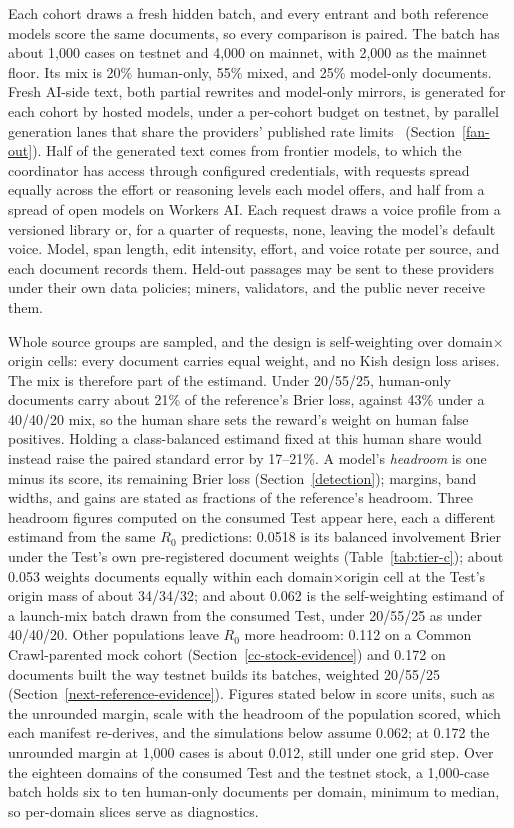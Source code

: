 Each cohort draws a fresh hidden batch, and every entrant and both reference
models score the same documents, so every comparison is paired. The batch has
about 1,000 cases on testnet and 4,000 on mainnet, with 2,000 as the mainnet
floor. Its mix is 20\% human-only, 55\% mixed, and 25\% model-only documents.
Fresh AI-side text, both partial rewrites and model-only mirrors, is generated
for each cohort by hosted models, under a per-cohort budget on testnet, by parallel
generation lanes that share the providers' published rate
limits~\cite{cfailimits} (Section~\ref{fan-out}). Half of the generated text
comes from frontier models, to which the coordinator has access through
configured credentials, with requests spread equally across the effort or
reasoning levels each model offers, and half from a spread of open models on
Workers AI. Each request draws a voice profile
from a versioned library or, for a quarter of requests, none, leaving the
model's default voice. Model, span length, edit intensity, effort, and voice
rotate per source, and each document records them. Held-out passages may be
sent to these providers under their own data policies; miners, validators, and
the public never receive them.

Whole source groups are sampled, and the design is self-weighting over
domain\(\times\)origin cells: every document carries equal weight, and no Kish
design loss arises. The mix is therefore part of the estimand. Under 20/55/25,
human-only documents carry about 21\% of the reference's Brier loss, against
43\% under a 40/40/20 mix, so the human share sets the reward's weight on human
false positives. Holding a class-balanced estimand fixed at this human share
would instead raise the paired standard error by 17--21\%. A model's
\emph{headroom} is one minus its score, its remaining Brier loss
(Section~\ref{detection}); margins, band widths, and gains are stated as
fractions of the reference's headroom. Three headroom
figures computed on the consumed Test appear here, each a different estimand
from the same \(R_0\) predictions: 0.0518 is its balanced involvement
Brier under the Test's own pre-registered document weights
(Table~\ref{tab:tier-c}); about 0.053 weights documents equally within each
domain\(\times\)origin cell at the Test's origin mass of about 34/34/32; and
about 0.062 is the self-weighting estimand of a launch-mix batch drawn from the
consumed Test, under 20/55/25 as under 40/40/20. Other populations leave
\(R_0\) more headroom: 0.112 on a Common Crawl-parented mock cohort
(Section~\ref{cc-stock-evidence}) and 0.172 on documents built the way testnet
builds its batches, weighted 20/55/25 (Section~\ref{next-reference-evidence}).
Figures stated below in score units, such as the unrounded margin, scale with
the headroom of the population scored, which each manifest re-derives, and the
simulations below assume 0.062; at 0.172 the unrounded margin at 1,000 cases is
about 0.012, still under one grid step. Over the eighteen domains of the
consumed Test and the testnet stock, a 1,000-case batch holds six to ten
human-only documents per domain, minimum to median, so per-domain slices serve
as diagnostics.

